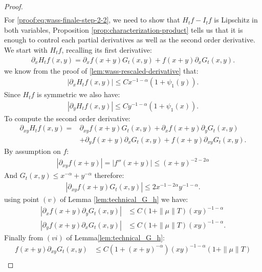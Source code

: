 \documentclass[11pt,a4paper]{article}
\begin{document}
\begin{proof}
\begin{align*}
    \end{align*}
    For \eqref{proof:eq:wass-finale-step-2-2}, we need to show that $H_tf - I_tf$ is Lipschitz in both variables, Proposition \ref{prop:characterization-product} tells us that it is enough to control each partial derivatives as well as the second order  derivative. We start with $H_tf$, recalling its first derivative:
    \begin{align*}
        \partial_x H_tf(x,y) = \partial_x f(x+y) G_t(x,y) + f(x+y) \partial_x G_t(x,y).
    \end{align*}
    we know from the proof of \ref{lem:wass-rescaled-derivative} that:
    \begin{align*}
        \left|\partial_x H_tf(x,y)\right| \leq C x^{-1-\alpha} (1 + \psi_1(y)).
    \end{align*}
    Since $H_tf$ is symmetric we also have:
    \begin{align*}
        \left|\partial_y H_tf(x,y)\right| \leq C y^{-1-\alpha} (1 + \psi_1(x)).
    \end{align*}
    To compute the second order  derivative:
    \begin{align*}
        \partial_{xy} H_tf(x,y) 
        =&  \partial_{xy}f(x+y) G_t(x,y)+ \partial_x f(x+y) \partial_yG_t(x,y) \\
        &+ \partial_y f(x+y) \partial_xG_t(x,y)  + f(x+y )\partial_{xy} G_t(x,y).
    \end{align*}
    By assumption on $f$:
    \begin{align*}
        \left| \partial_{xy} f(x+y)\right| = \left|  f''(x+y)\right| \leq (x+y)^{-2-2\alpha}
    \end{align*}
    And $G_t(x,y) \leq x^{-\alpha} + y^{-\alpha}$ therefore:
    \begin{align*}
        \left|  \partial_{xy} f(x+y) G_t(x,y)\right| \leq 2 x^{-1-2\alpha}y^{-1-\alpha}.
    \end{align*}
    using point $(v)$ of Lemma \ref{lem:technical_G_h} we have:
    \begin{align*}
        \left| \partial_x f(x+y) \partial_yG_t(x,y) \right| &\leq C(1 + \|\mu\|T) (xy)^{-1-\alpha} \\
        \left| \partial_y f(x+y) \partial_xG_t(x,y) \right| &\leq C(1 + \|\mu\|T) (xy)^{-1-\alpha}.
    \end{align*}
    Finally from $(vi)$ of Lemma\ref{lem:technical_G_h}:
    \begin{align*}
        f(x+y )\partial_{xy} G_t(x,y) 
        &\leq C (1 + (x+y)^{-\alpha})(xy)^{-1-\alpha} \left(1 + \|\mu\|T\right) \\

\end{align*}
\end{proof}
\end{document}
